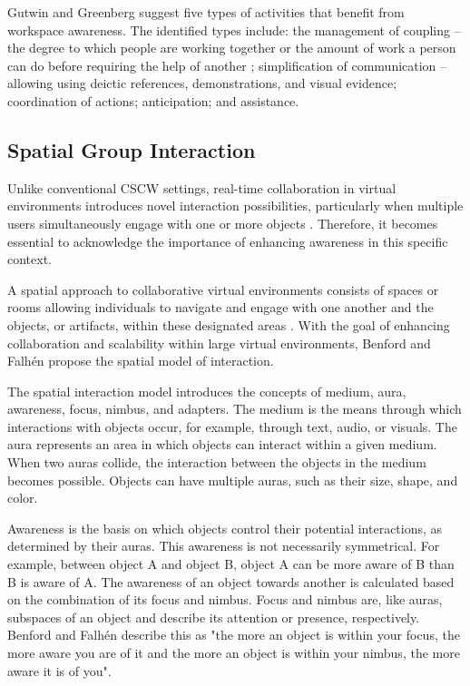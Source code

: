     Gutwin and Greenberg \cite{gutwinDescriptiveFrameworkWorkspace2002} suggest five types of activities that benefit from workspace awareness. The identified types include: the management of coupling -- the degree to which people are working together \cite{salvadorDenverModelGroupware1996} or the amount of work a person can do before requiring the help of another \cite{gutwinDescriptiveFrameworkWorkspace2002}; simplification of communication -- allowing using deictic references, demonstrations, and visual evidence; coordination of actions; anticipation; and assistance.


    \subsection{Spatial Group Interaction} \label{sec:sota_spatial}

    Unlike conventional CSCW settings, real-time collaboration in virtual environments introduces novel interaction possibilities, particularly when multiple users simultaneously engage with one or more objects \cite{brollInteractingDistributedCollaborative1995}. Therefore, it becomes essential to acknowledge the importance of enhancing awareness in this specific context.

    A spatial approach to collaborative virtual environments consists of spaces or rooms allowing individuals to navigate and engage with one another and the objects, or artifacts, within these designated areas \cite{benfordSpatialModelInteraction1993}. With the goal of enhancing collaboration and scalability within large virtual environments, Benford and Falhén \cite{benfordSpatialModelInteraction1993} propose the spatial model of interaction. 

    The spatial interaction model introduces the concepts of medium, aura, awareness, focus, nimbus, and adapters. The medium is the means through which interactions with objects occur, for example, through text, audio, or visuals. The aura represents an area in which objects can interact within a given medium. When two auras collide, the interaction between the objects in the medium becomes possible. Objects can have multiple auras, such as their size, shape, and color.

    Awareness is the basis on which objects control their potential interactions, as determined by their auras. This awareness is not necessarily symmetrical. For example, between object A and object B, object A can be more aware of B than B is aware of A. The awareness of an object towards another is calculated based on the combination of its focus and nimbus. Focus and nimbus are, like auras, subspaces of an object and describe its attention or presence, respectively. Benford and Falhén \cite{benfordSpatialModelInteraction1993} describe this as "the more an object is within your focus, the more aware you are of it and the more an object is within your nimbus, the more aware it is of you".

